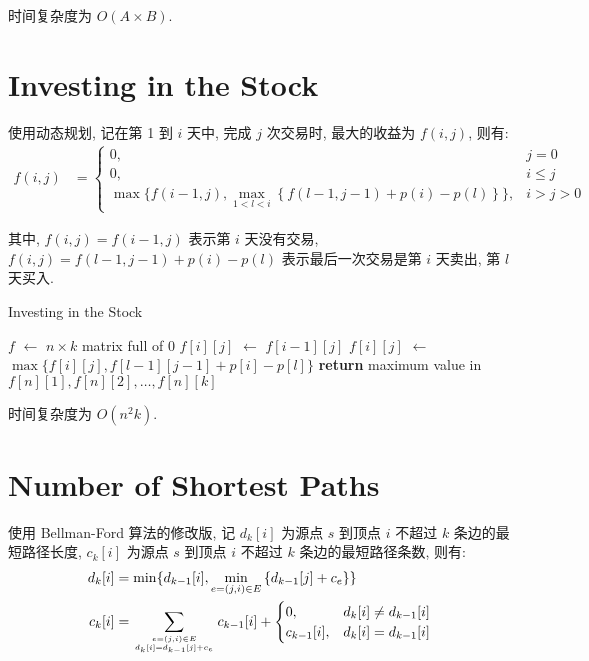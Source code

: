 \documentclass{ctexart}
\newcommand{\Let}[1]{\State #1 $\gets$}
\newcommand{\Ret}[1]{\State \textbf{return} #1}
\begin{document}
时间复杂度为 $O(A\times B)$.

\section{Investing in the Stock}

使用动态规划, 记在第 1 到 $i$ 天中, 完成 $j$ 次交易时, 最大的收益为 $f(i, j)$, 则有:
\begin{align*}
    f(i, j) & = \begin{cases}
                    0,                                                                            & j = 0   \\
                    0,                                                                            & i \le j \\
                    \max\{f(i-1, j), \max\limits_{1< l< i}\left\{f(l-1, j-1)+p(i)-p(l)\right\}\}, & i>j>0
                \end{cases}
\end{align*}

其中, $f(i,j)=f(i-1, j)$ 表示第 $i$ 天没有交易, $f(i,j)=f(l-1, j-1)+p(i)-p(l)$ 表示最后一次交易是第 $i$ 天卖出, 第 $l$ 天买入.

\begin{algorithm}[H]
    \caption{Investing in the Stock}
    \begin{algorithmic}
        \Let{$f$} $n\times k$ matrix full of 0
                \Let{$f[i][j]$} $f[i-1][j]$
                    \Let{$f[i][j]$} $\max\{f[i][j], f[l-1][j-1] + p[i] - p[l]\}$
                \EndFor
            \EndFor
        \EndFor
        \Ret maximum value in $f[n][1], f[n][2], \ldots, f[n][k]$
        \EndFunction
    \end{algorithmic}
\end{algorithm}

时间复杂度为 $O(n^2 k)$.

\section{Number of Shortest Paths}

使用 Bellman-Ford 算法的修改版, 记 $d_k[i]$ 为源点 $s$ 到顶点 $i$ 不超过 $k$ 条边的最短路径长度, $c_k[i]$ 为源点 $s$ 到顶点 $i$ 不超过 $k$ 条边的最短路径条数, 则有:
\begin{align*}
    d_k[i] & = \min\{d_{k-1}[i], \min\limits_{e=(j, i)\in E}\left\{d_{k-1}[j] + c_e\right\}\}                  \\
    c_k[i] & = \sum_{e=(j,i)\in E\atop d_k[i]=d_{k-1}[j]+c_e} c_{k-1}[i] + \begin{cases}
                                                                               0,          & d_k[i] \ne d_{k-1}[i] \\
                                                                               c_{k-1}[i], & d_k[i] = d_{k-1}[i]
                                                                           \end{cases}
\end{align*}
\end{document}
